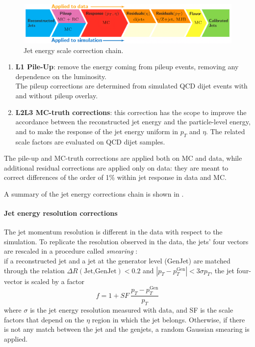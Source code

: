 \begin{figure}[H]
    \centering
    \includegraphics[width=\linewidth]{fig//chap07-selection/JEC_upscayl_2x_ultramix_balanced.png}
    \caption{Jet energy scale correction chain.}
    \label{fig:jerc}
\end{figure}
\begin{enumerate}
    \item \textbf{L1 Pile-Up}: remove the energy coming from pileup events, removing any dependence on the luminosity.\\
    The pileup corrections are determined from simulated QCD dijet events with and without pileup overlay.
    \item \textbf{L2L3 MC-truth corrections}: this correction has the scope to improve the accordance between the reconstructed jet energy and the particle-level energy, and to make the response of the jet energy uniform in $p_T$ and $\eta$. The related scale factors are evaluated on QCD dijet samples.
\end{enumerate}
The pile-up and MC-truth corrections are applied both on MC and data, while additional residual corrections are applied only on data: they are meant to correct differences of the order of 1\% within jet response in data and MC.

A summary of the jet energy corrections chain is shown in .

\paragraph*{Jet energy resolution corrections}\label{par:JERC}
The jet momentum resolution is different in the data with respect to the simulation. To replicate the resolution observed in the data, the jets' four vectors are rescaled in a procedure called \emph{smearing} \cite{2021Jet13TeV}:\\
if a reconstructed jet and a jet at the generator level (GenJet) are matched through the relation $\Delta R(\text{Jet,GenJet})<0.2$ and $|p_T-p_T^{\text{Gen}}|<3\sigma p_T$, the jet four-vector is scaled by a factor
\begin{equation}
    f=1+\textit{SF}\:\frac{p_T-p_T^{\text{Gen}}}{p_T}
\end{equation}
where $\sigma$ is the jet energy resolution measured with data, and SF is the scale factors that depend on the $\eta$ region in which the jet belongs.
Otherwise, if there is not any match between the jet and the genjets, a random Gaussian smearing is applied.


